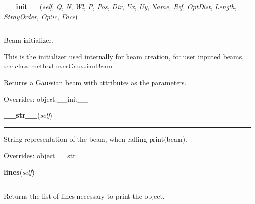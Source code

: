 \hspace{.8\funcindent}\begin{boxedminipage}{\funcwidth}

    \raggedright \textbf{\_\_init\_\_}(\textit{self}, \textit{Q}, \textit{N}, \textit{Wl}, \textit{P}, \textit{Pos}, \textit{Dir}, \textit{Ux}, \textit{Uy}, \textit{Name}, \textit{Ref}, \textit{OptDist}, \textit{Length}, \textit{StrayOrder}, \textit{Optic}, \textit{Face})

    \vspace{-1.5ex}

    \rule{\textwidth}{0.5\fboxrule}
\setlength{\parskip}{2ex}
    Beam initializer.

    This is the initializer used internally for beam creation, for user 
    inputed beams, see class method userGaussianBeam.

    Returns a Gaussian beam with attributes as the parameters.

\setlength{\parskip}{1ex}
      Overrides: object.\_\_init\_\_

    \end{boxedminipage}

    \vspace{0.5ex}

\hspace{.8\funcindent}\begin{boxedminipage}{\funcwidth}

    \raggedright \textbf{\_\_str\_\_}(\textit{self})

    \vspace{-1.5ex}

    \rule{\textwidth}{0.5\fboxrule}
\setlength{\parskip}{2ex}
    String representation of the beam, when calling print(beam).

\setlength{\parskip}{1ex}
      Overrides: object.\_\_str\_\_

    \end{boxedminipage}

    \label{theia:optics:beam:GaussianBeam:lines}

    \vspace{0.5ex}

\hspace{.8\funcindent}\begin{boxedminipage}{\funcwidth}

    \raggedright \textbf{lines}(\textit{self})

    \vspace{-1.5ex}

    \rule{\textwidth}{0.5\fboxrule}
\setlength{\parskip}{2ex}
    Returns the list of lines necessary to print the object.

\setlength{\parskip}{1ex}
    \end{boxedminipage}

